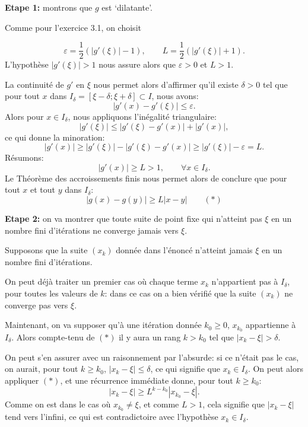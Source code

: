 \documentclass{article}
\begin{document}
{\bf Etape 1:} montrons que $g$ est `dilatante'.

\smallskip

Comme pour l'exercice 3.1, on choisit

\[
\varepsilon = \frac12 (|g'(\xi)| - 1), \qquad L = \frac12 ( |g'(\xi)| + 1 ).
\]
L'hypothèse $|g'(\xi)|>1$ nous assure alors que $\varepsilon > 0$ et $L>1$.

La continuité de $g'$ en $\xi$ nous permet alors d'affirmer qu'il existe $\delta > 0$ tel que pour tout $x$ dans $I_\delta = [ \xi - \delta ; \xi + \delta ] \subset I$, nous avons:
\[
|g'(x) - g'(\xi)| \leq \varepsilon.
\]
Alors pour $x \in I_\delta$, nous appliquons l'inégalité triangulaire:
\[
|g'(\xi)| \leq |g'(\xi) - g'(x)| + |g'(x)|,
\]
ce qui donne la minoration:
\[
|g'(x)| \geq |g'(\xi)| - |g'(\xi) - g'(x)| \geq |g'(\xi)| - \varepsilon = L.
\]
Résumons:
\[
|g'(x)| \geq  L > 1, \qquad \forall x \in I_\delta.
\]
Le Théorème des accroissements finis nous permet alors de conclure que pour tout $x$ et tout $y$ dans $I_\delta$:
\[
|g(x)-g(y)| \geq L |x-y| \qquad (*)
\]

\smallskip

{\bf Etape 2:} on va montrer que toute suite de point fixe qui n'atteint pas $\xi$ en un nombre fini d'itérations ne converge jamais vers $\xi$.

\smallskip

Supposons que la suite $(x_k)$ donnée dans l'énoncé n'atteint jamais $\xi$ en un nombre fini d'itérations.

\smallskip

On peut déjà traiter un premier cas où chaque terme $x_k$ n'appartient pas à $I_\delta$, pour toutes les valeurs de $k$: dans ce cas on a bien vérifié que la suite $(x_k)$ ne converge pas vers $\xi$. 

\smallskip

Maintenant, on va supposer qu'à une itération donnée $k_0 \geq 0$, $x_{k_0}$ appartienne à $I_\delta$. Alors compte-tenu de $(*)$ il y aura un rang $k > k_0$ tel que $|x_k - \xi | > \delta$.


On peut s'en assurer avec un raisonnement par l'absurde: si ce n'était pas le cas, on aurait, pour tout $k \geq k_0$, $|x_k - \xi| \leq \delta$, ce qui signifie que $x_k \in I_\delta$. On peut alors appliquer $(*)$, et une récurrence immédiate donne, pour tout $k \geq k_0$:
\[
|x_{k} -\xi | \geq L^{k-k_0} |x_{k_0} - \xi|.
\]
Comme on est dans le cas où $x_{k_0} \neq \xi$, et comme $L>1$, cela signifie que $|x_{k} -\xi |$ tend vers l'infini, ce qui est contradictoire avec l'hypothèse $x_k \in I_\delta$.
\end{document}
